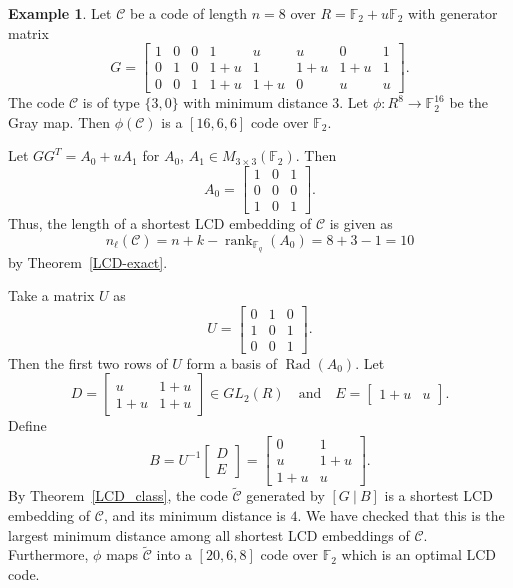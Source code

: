 \documentclass{article}
\theoremstyle{definition}
\newtheorem{example}{Example}[section]
\theoremstyle{remark}
\begin{document}
\begin{example}\label{LCDex}
    Let $\mathcal{C}$ be a code of length $n=8$ over $R=\mathbb{F}_2+u\mathbb{F}_2$ with generator matrix
    \[
    G=
    \left[
    \begin{array}{cccccccc}
    1 & 0 & 0 & 1 & u & u & 0 & 1\\
    0 & 1 & 0 & 1+u & 1 & 1+u & 1+u & 1\\
    0 & 0 & 1 & 1+u & 1+u & 0 & u & u
    \end{array}
    \right].
    \]
    The code $\mathcal{C}$ is of type $\{3, 0\}$ with minimum distance 3. Let $\phi:R^{8}\to \mathbb{F}_2^{16}$ be the Gray map. Then $\phi(\mathcal{C})$ is a $[16, 6, 6]$ code over $\mathbb{F}_2$.
    
    Let $GG^T=A_0+uA_1$ for $A_0,\,A_1\in M_{3\times 3}(\mathbb{F}_2)$. Then
    \[
    A_0=\begin{bmatrix}
        1 & 0 & 1\\
        0 & 0 & 0\\
        1 & 0 & 1
    \end{bmatrix}.
    \]
    Thus, the length of a shortest LCD embedding of $\mathcal{C}$ is given as
    \[
    n_\ell(\mathcal{C})=n+k-\operatorname{rank}_{\mathbb{F}_q}(A_0)=8+3-1=10
    \]
    by Theorem~\ref{LCD-exact}.

    Take a matrix $U$ as
    \[
    U=\begin{bmatrix}
        0 & 1 & 0\\
        1 & 0 & 1\\
        0 & 0 & 1
    \end{bmatrix}.
    \]
    Then the first two rows of $U$ form a basis of $\operatorname{Rad}(A_0)$. Let
    \[
    D=\begin{bmatrix}
        u & 1+u\\
        1+u & 1+u
    \end{bmatrix}\in GL_2(R)\quad\mbox{and}\quad
    E=\begin{bmatrix}
        1+u & u
    \end{bmatrix}.
    \]
    Define
    \[
    B=U^{-1}\begin{bmatrix}
        D\\E
    \end{bmatrix}=\begin{bmatrix}
        0 & 1\\
        u & 1+u\\1+u & u
    \end{bmatrix}.
    \]
    By Theorem~\ref{LCD_class}, the code $\tilde{\mathcal{C}}$ generated by $[G~|~B]$ is a shortest LCD embedding of $\mathcal{C}$, and its minimum distance is $4$. We have checked that this is the largest minimum distance among all shortest LCD embeddings of $\mathcal{C}$. Furthermore, $\phi$ maps $\tilde{\mathcal{C}}$ into a $[20, 6, 8]$ code over $\mathbb{F}_2$ which is an optimal LCD code.
\end{example}
\end{document}
